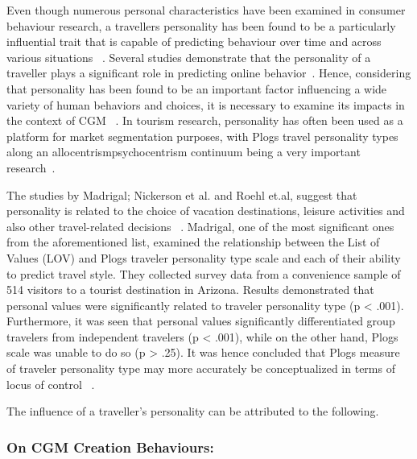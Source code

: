 Even though numerous personal characteristics have been examined in consumer behaviour research, a traveller\textquotesingle s personality has been found to be a particularly influential trait that is capable of predicting behaviour over time and across various situations ~\cite{woszczynski2002exploring}. Several studies demonstrate that the personality of a traveller plays a significant role in predicting online behavior~\cite{yoo2011influence, acar2007online, tuten2001understanding}. Hence, considering that personality has been found to be an important factor influencing a wide variety of human behaviors and choices, it is necessary to examine its impacts in the context of CGM ~\cite{yoo2011influence}. In tourism research, personality has often been used as a platform for market segmentation purposes, with Plog\textquotesingle s travel personality types along an allocentrism\textemdash psychocentrism continuum being a very important research~\cite{plog1973destination, yoo2011influence}.

The studies by Madrigal; Nickerson et al. and Roehl et.al, suggest that personality is related to the choice of vacation destinations, leisure activities and also other travel-related decisions ~\cite{madrigal1995personal, nickerson1991traveler, roehl1992risk}. Madrigal, one of the most significant ones from the aforementioned list, examined the relationship between the List of Values (LOV) and Plog\textquotesingle s traveler personality type scale and each of their ability to predict travel style. They collected survey data from a convenience sample of 514 visitors to a tourist destination in Arizona. Results demonstrated that personal values were significantly related to traveler personality type (p < .001). Furthermore, it was seen that personal values significantly differentiated group travelers from independent travelers (p < .001), while on the other hand, Plog\textquotesingle s scale was unable to do so (p > .25). It was hence concluded that Plog\textquotesingle s measure of traveler personality type may more accurately be conceptualized in terms of locus of control ~\cite{madrigal1995personal}.

The influence of a traveller's personality can be attributed to the following. 

\subsubsection{On CGM Creation Behaviours: }\label{3.1}


